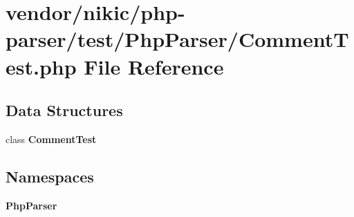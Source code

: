 \section{vendor/nikic/php-\/parser/test/\+Php\+Parser/\+Comment\+Test.php File Reference}
\label{_comment_test_8php}
\subsection*{Data Structures}
\begin{DoxyCompactItemize}
\item 
class {\bf Comment\+Test}
\end{DoxyCompactItemize}
\subsection*{Namespaces}
\begin{DoxyCompactItemize}
\item 
 {\bf Php\+Parser}
\end{DoxyCompactItemize}
